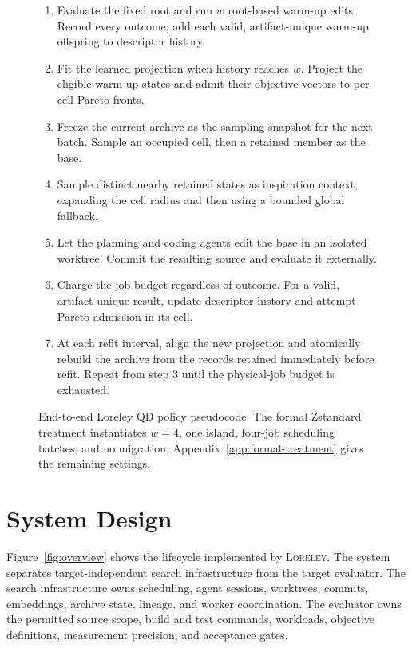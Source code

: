 \documentclass[10pt,twocolumn]{article}
\newcommand{\system}{\textsc{Loreley}\xspace}
\begin{document}
\begin{figure}[t]
  \begin{enumerate}[leftmargin=1.4em,itemsep=1pt,topsep=2pt]
    \item Evaluate the fixed root and run $w$ root-based warm-up edits. Record
      every outcome; add each valid, artifact-unique warm-up offspring to
      descriptor history.
    \item Fit the learned projection when history reaches $w$. Project the
      eligible warm-up states and admit their objective vectors to per-cell
      Pareto fronts.
    \item Freeze the current archive as the sampling snapshot for the next
      batch. Sample an occupied cell, then a retained member as the base.
    \item Sample distinct nearby retained states as inspiration context,
      expanding the cell radius and then using a bounded global fallback.
    \item Let the planning and coding agents edit the base in an isolated
      worktree. Commit the resulting source and evaluate it externally.
    \item Charge the job budget regardless of outcome. For a valid,
      artifact-unique result, update descriptor history and attempt Pareto
      admission in its cell.
    \item At each refit interval, align the new projection and atomically
      rebuild the archive from the records retained immediately before refit.
      Repeat from step 3 until the physical-job budget is exhausted.
  \end{enumerate}
  \caption{End-to-end Loreley QD policy pseudocode. The formal Zstandard
  treatment instantiates $w=4$, one island, four-job scheduling batches, and
  no migration; Appendix~\ref{app:formal-treatment} gives the remaining
  settings.}
  \label{fig:algorithm}
\end{figure}

\section{System Design}
\label{sec:system}

Figure~\ref{fig:overview} shows the lifecycle implemented by \system. The system
separates target-independent search infrastructure from the target evaluator.
The search infrastructure owns scheduling, agent sessions, worktrees, commits,
embeddings, archive state, lineage, and worker coordination. The evaluator
owns the permitted source scope, build and test commands, workloads, objective
definitions, measurement precision, and acceptance gates.
\end{document}
